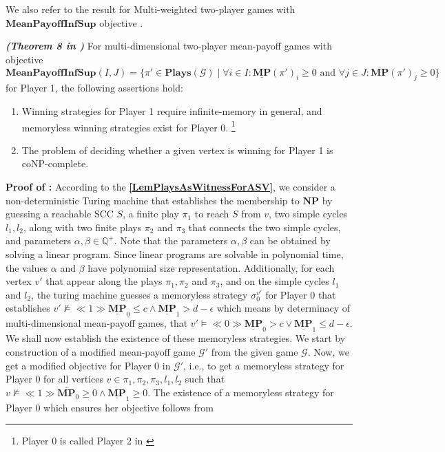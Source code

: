 \noindent We also refer to the result for Multi-weighted two-player games with $\mathbf{MeanPayoffInfSup}$ objective \cite{VCDHRR15}.

\begin{theorem}
    \label{ThmMemlessStrForP2}
    \textbf{\emph{(Theorem 8 in \cite{VCDHRR15})}} For multi-dimensional two-player mean-payoff games with objective \\
    $\mathbf{MeanPayoffInfSup}(I,J) = \{\pi' \in \mathbf{Plays}(\mathcal{G}) \mid \forall i \in I : \underline{\mathbf{MP}}(\pi')_i \geqslant 0 \text{ and } \forall j \in J : \overline{\mathbf{MP}}(\pi')_j \geqslant 0\}$ for Player 1, the following assertions hold:
    \begin{enumerate}
        \item Winning strategies for Player 1 require infinite-memory in general, and memoryless winning strategies exist for Player 0. \footnote{Player 0 is called Player 2 in \cite{FGR20}}
        \item The problem of deciding whether a given vertex is winning for Player 1 is coNP-complete.
    \end{enumerate}
\end{theorem}

\textbf{Proof of :} According to the \textbf{\cref{LemPlaysAsWitnessForASV}}, we consider a non-deterministic Turing machine that establishes the membership to $\mathbf{NP}$ by guessing a reachable SCC $S$, a finite play $\pi_1$ to reach $S$ from $v$, two simple cycles $l_1, l_2$, along with two finite plays $\pi_2$ and $\pi_3$ that connects the two simple cycles, and parameters $\alpha, \beta \in \mathbb{Q}^{+}$. Note that the parameters $\alpha , \beta$ can be obtained by solving a linear program. Since linear programs are solvable in polynomial time, the values $\alpha$ and $\beta$ have polynomial size representation. Additionally, for each vertex $v'$ that appear along the plays $\pi_1, \pi_2$ and $\pi_3$, and on the simple cycles $l_1$ and $l_2$, the turing machine guesses a memoryless strategy $\sigma_0^{v'}$ for Player 0 that establishes $v' \nvDash \ll 1 \gg \underline{\textbf{MP}}_0 \leqslant c \land \underline{\textbf{MP}}_1 > d - \epsilon$ which means by determinacy of multi-dimensional mean-payoff games, that $v' \models \ll 0 \gg \underline{\textbf{MP}}_0 > c \lor \underline{\textbf{MP}}_1 \leqslant d - \epsilon$. We shall now establish the existence of these memoryless strategies. 
We start by construction of a modified mean-payoff game $\mathcal{G'}$ from the given game $\mathcal{G}$. Now, we get a modified objective for Player 0 in $\mathcal{G'}$, i.e., to get a memoryless strategy for Player 0 for all vertices $v \in \pi_1, \pi_2, \pi_3, l_1, l_2$ such that $v \nvDash \ll 1 \gg \overline{\mathbf{MP}}_0 \geqslant 0 \land \underline{\mathbf{MP}}_1 \geqslant 0$. The existence of a memoryless strategy for Player 0 which ensures her objective follows from \textbf{}

